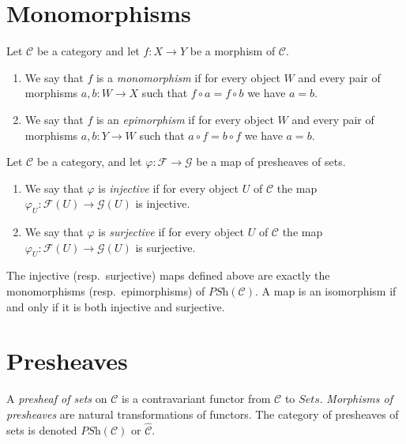 \section{Monomorphisms}
\label{section-monomorphisms-and-epimorphisms}

\begin{definition}
\label{definition-mono-epi}
Let $\mathcal{C}$ be a category and let $f : X \to Y$ be
a morphism of $\mathcal{C}$.
\begin{enumerate}
\item We say that $f$ is a {\it monomorphism} if for every object
$W$ and every pair of morphisms $a, b : W \to X$ such that
$f \circ a = f \circ b$ we have $a = b$.
\item We say that $f$ is an {\it epimorphism} if for every object
$W$ and every pair of morphisms $a, b : Y \to W$ such that
$a \circ f = b \circ f$ we have $a = b$.
\end{enumerate}
\end{definition}

\begin{definition}
\label{definition-presheaves-injective-surjective}
Let $\mathcal{C}$ be a category, and let $\varphi : \mathcal{F}
\to \mathcal{G}$ be a map of presheaves of sets.
\begin{enumerate}
\item We say that $\varphi$ is {\it injective} if for every object
$U$ of $\mathcal{C}$ the map $\varphi_U : \mathcal{F}(U)
\to \mathcal{G}(U)$ is injective.
\item We say that $\varphi$ is {\it surjective} if for every object
$U$ of $\mathcal{C}$ the map $\varphi_U : \mathcal{F}(U)
\to \mathcal{G}(U)$ is surjective.
\end{enumerate}
\end{definition}

\begin{lemma}
\label{lemma-mono-epi}
The injective (resp.\ surjective) maps defined above
are exactly the monomorphisms (resp.\ epimorphisms) of
$\textit{PSh}(\mathcal{C})$. A map is an isomorphism
if and only if it is both injective and surjective.
\end{lemma}

\section{Presheaves}
\label{section-presheaves}

\begin{definition}
\label{definition-presheaves-sets}
A {\it presheaf of sets} on $\mathcal{C}$ is a contravariant
functor from $\mathcal{C}$ to $\textit{Sets}$. {\it Morphisms
of presheaves} are natural transformations of functors.
The category
of presheaves of sets is denoted $\textit{PSh}(\mathcal{C})$
or $\hat{\mathcal{C}}$.
\end{definition}

